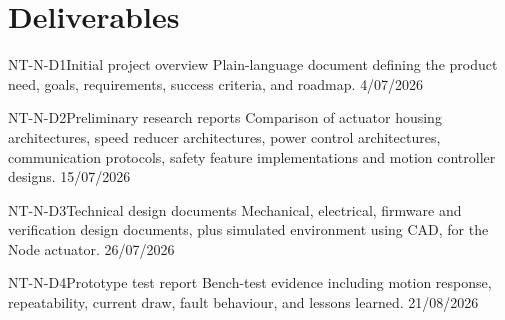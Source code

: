 \documentclass[public]{../../classes/nervtech-overview}
\begin{document}
\section{Deliverables}
\begin{deliverablestable}
  \deliverablerow
  {NT-N-D1}{Initial project overview}
  {Plain-language document defining the product need, goals, requirements, success criteria, and roadmap.}
  {4/07/2026}

  \deliverablerow
  {NT-N-D2}{Preliminary research reports}
  {Comparison of actuator housing architectures, speed reducer architectures, power control architectures, communication protocols, safety feature implementations and motion controller designs.}
  {15/07/2026}

  \deliverablerow
  {NT-N-D3}{Technical design documents}
  {Mechanical, electrical, firmware and verification design documents, plus simulated environment using CAD, for the Node actuator.}
  {26/07/2026}

  \deliverablerow
  {NT-N-D4}{Prototype test report}
  {Bench-test evidence including motion response, repeatability, current draw, fault behaviour, and lessons learned.}
  {21/08/2026}
\end{deliverablestable}
\end{document}
